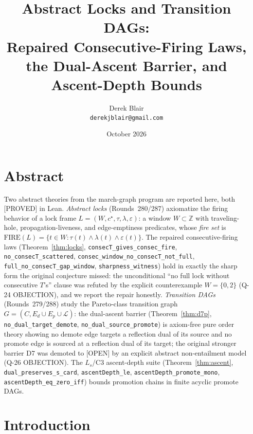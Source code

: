 \documentclass[11pt,a4paper]{article}
\title{Abstract Locks and Transition DAGs:\\
  Repaired Consecutive-Firing Laws, the Dual-Ascent Barrier, and
  Ascent-Depth Bounds}
\author{Derek Blair \\ \texttt{derekjblair@gmail.com}}
\date{October 2026}
\theoremstyle{definition}
\begin{document}
\maketitle

\section{Abstract}

Two abstract theories from the march-graph program are reported here,
both [PROVED] in Lean. \emph{Abstract locks} (Rounds~280/287) axiomatize
the firing behavior of a lock frame $L=(W,c^\star,\tau,\lambda,
\varepsilon)$: a window $W\subset\mathbb{Z}$ with traveling-hole,
propagation-liveness, and edge-emptiness predicates, whose \emph{fire
set} is $\mathrm{FIRE}(L)=\{t\in W:\tau(t)\land\lambda(t)\land
\varepsilon(t)\}$. The repaired consecutive-firing laws
(Theorem~\ref{thm:locks}, \texttt{consecT\_gives\_consec\_fire},
\texttt{no\_consecT\_scattered},
\texttt{consec\_window\_no\_consecT\_not\_full},
\texttt{full\_no\_consecT\_gap\_window}, \texttt{sharpness\_witness})
hold in exactly the sharp form the original conjecture missed: the
unconditional ``no full lock without consecutive $T$'s'' clause was
refuted by the explicit counterexample $W=\{0,2\}$ (Q-24 OBJECTION), and
we report the repair honestly. \emph{Transition DAGs} (Rounds~279/288)
study the Pareto-class transition graph $G=(C,E_d\cup E_p\cup\mathcal{L})$:
the dual-ascent barrier (Theorem~\ref{thm:d7p},
\texttt{no\_dual\_target\_demote}, \texttt{no\_dual\_source\_promote})
is axiom-free pure order theory showing no demote edge targets a
reflection dual of its source and no promote edge is sourced at a
reflection dual of its target; the original stronger barrier D7 was
demoted to [OPEN] by an explicit abstract non-entailment model (Q-26
OBJECTION). The $L_s$/C3 ascent-depth suite
(Theorem~\ref{thm:ascent}, \texttt{dual\_preserves\_s\_card},
\texttt{ascentDepth\_le}, \texttt{ascentDepth\_promote\_mono},
\texttt{ascentDepth\_eq\_zero\_iff}) bounds promotion chains in finite
acyclic promote DAGs.

\section{Introduction}
\end{document}
